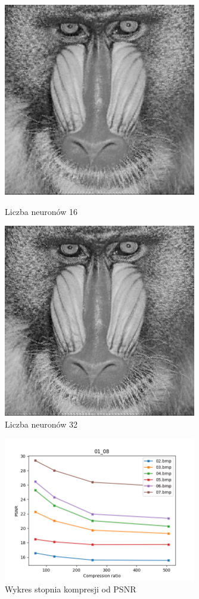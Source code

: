 \documentclass[../EDI_Task4_Karwowski_Kowalewski.tex]{subfiles}
\begin{document}
{    \begin{figure}[!htbp]
        \begin{minipage}[c]{0.49\linewidth}
            \centering
            \includegraphics[width=0.75\textwidth]{img/results_1/16/compressed_02.png}
            \caption{Liczba neuronów 16}
        \end{minipage}\hfill
        \begin{minipage}[c]{0.49\linewidth}
            \centering
            \includegraphics[width=0.75\textwidth]{img/results_1/32/compressed_02.png}
            \caption{Liczba neuronów 32}
        \end{minipage}
    \end{figure}

    \begin{figure}[!htbp]
        \centering
        \includegraphics[width=0.75\textwidth]{img/results_1/stats_01_08.png}
        \caption{Wykres stopnia kompresji od PSNR}
    \end{figure}
    \FloatBarrier
}
\end{document}
